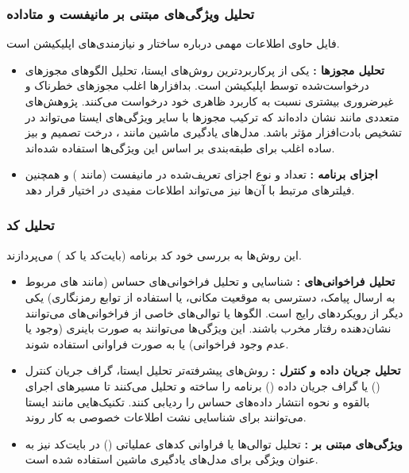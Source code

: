 \subsubsection{تحلیل ویژگی‌های مبتنی بر مانیفست و متاداده}
فایل  حاوی اطلاعات مهمی درباره ساختار و نیازمندی‌های اپلیکیشن است.
\begin{itemize}
    \item \textbf{تحلیل مجوزها :} یکی از پرکاربردترین روش‌های ایستا، تحلیل الگوهای مجوزهای درخواست‌شده توسط اپلیکیشن است. بدافزارها اغلب مجوزهای خطرناک و غیرضروری بیشتری نسبت به کاربرد ظاهری خود درخواست می‌کنند. پژوهش‌های متعددی مانند  \cite{Drebin} نشان داده‌اند که ترکیب مجوزها با سایر ویژگی‌های ایستا می‌تواند در تشخیص بادت‌افزار مؤثر باشد. مدل‌های یادگیری ماشین مانند ، درخت تصمیم و بیز ساده اغلب برای طبقه‌بندی بر اساس این ویژگی‌ها استفاده شده‌اند.
    \item \textbf{اجزای برنامه :} تعداد و نوع اجزای تعریف‌شده در مانیفست (مانند ) و همچنین فیلترهای  مرتبط با آن‌ها نیز می‌تواند اطلاعات مفیدی در اختیار قرار دهد.
\end{itemize}

\subsubsection{تحلیل کد }
این روش‌ها به بررسی خود کد برنامه (بایت‌کد  یا کد ) می‌پردازند.
\begin{itemize}
    \item \textbf{تحلیل فراخوانی‌های :} شناسایی و تحلیل فراخوانی‌های  حساس (مانند های مربوط به ارسال پیامک، دسترسی به موقعیت مکانی، یا استفاده از توابع رمزنگاری) یکی دیگر از رویکردهای رایج است. الگوها یا توالی‌های خاصی از فراخوانی‌های  می‌توانند نشان‌دهنده رفتار مخرب باشند. این ویژگی‌ها می‌توانند به صورت باینری (وجود یا عدم وجود فراخوانی) یا به صورت فراوانی استفاده شوند.
    \item \textbf{تحلیل جریان داده و کنترل :} روش‌های پیشرفته‌تر تحلیل ایستا، گراف جریان کنترل () یا گراف جریان داده () برنامه را ساخته و تحلیل می‌کنند تا مسیرهای اجرای بالقوه و نحوه انتشار داده‌های حساس را ردیابی کنند. تکنیک‌هایی مانند  ایستا می‌توانند برای شناسایی نشت اطلاعات خصوصی به کار روند.
    \item \textbf{ویژگی‌های مبتنی بر :} تحلیل توالی‌ها یا فراوانی کدهای عملیاتی () در بایت‌کد نیز به عنوان ویژگی برای مدل‌های یادگیری ماشین استفاده شده است.
\end{itemize}

